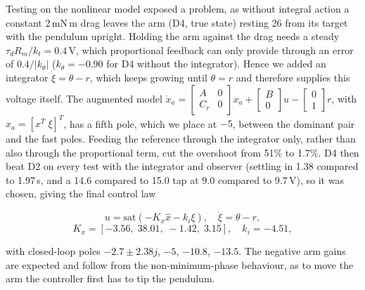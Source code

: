 Testing on the nonlinear model exposed a problem, as without integral action a constant 2\,mN\,m drag leaves the arm (D4, true state) resting 26\textdegree{} from its target with the pendulum upright. Holding the arm against the drag needs a steady $\tau_dR_m/k_t=0.4$\,V, which proportional feedback can only provide through an error of $0.4/|k_\theta|$ ($k_\theta=-0.90$ for D4 without the integrator). Hence we added an integrator $\dot\xi=\theta-r$, which keeps growing until $\theta=r$ and therefore supplies this voltage itself. The augmented model $\dot x_a=\left[\begin{smallmatrix}A&0\\C_r&0\end{smallmatrix}\right]x_a+\left[\begin{smallmatrix}B\\0\end{smallmatrix}\right]u-\left[\begin{smallmatrix}0\\1\end{smallmatrix}\right]r$, with $x_a=[x^T\;\xi]^T$, has a fifth pole, which we place at $-5$, between the dominant pair and the fast poles. Feeding the reference through the integrator only, rather than also through
the proportional term, cut the overshoot from 51\% to 1.7\%. D4 then beat
D2 on every test with the integrator and observer (settling in 1.38 compared to 1.97\,s, and a 14.6 compared to 15.0\textdegree{} tap at 9.0 compared to 9.7\,V), so it was chosen, giving the
final control law

\begin{equation}
u=\mathrm{sat}\!\left(-K_x\hat x-k_i\xi\right),\quad \dot\xi=\theta-r,
\end{equation}
\begin{equation}
K_x=[-3.56,\;38.01,\;-1.42,\;3.15],\quad k_i=-4.51,
\end{equation}
\begin{rw}
with closed-loop poles $-2.7\pm2.38j$, $-5$, $-10.8$, $-13.5$. The negative arm gains are expected and follow from the non-minimum-phase behaviour, as to move the arm the controller first has to tip the pendulum.
\end{rw}

